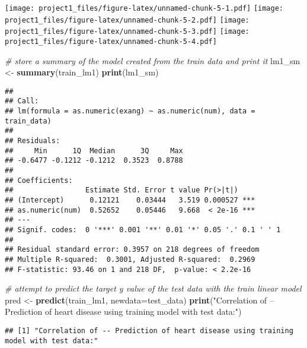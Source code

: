 \documentclass[]{article}
\newenvironment{Shaded}{\begin{snugshade}}{\end{snugshade}}
\newcommand{\KeywordTok}[1]{\textcolor[rgb]{0.13,0.29,0.53}{\textbf{#1}}}
\newcommand{\DataTypeTok}[1]{\textcolor[rgb]{0.13,0.29,0.53}{#1}}
\newcommand{\StringTok}[1]{\textcolor[rgb]{0.31,0.60,0.02}{#1}}
\newcommand{\CommentTok}[1]{\textcolor[rgb]{0.56,0.35,0.01}{\textit{#1}}}
\newcommand{\OperatorTok}[1]{\textcolor[rgb]{0.81,0.36,0.00}{\textbf{#1}}}
\newcommand{\NormalTok}[1]{#1}
\begin{document}
\texttt{[image: project1\_files/figure-latex/unnamed-chunk-5-1.pdf]}
\texttt{[image: project1\_files/figure-latex/unnamed-chunk-5-2.pdf]}
\texttt{[image: project1\_files/figure-latex/unnamed-chunk-5-3.pdf]}
\texttt{[image: project1\_files/figure-latex/unnamed-chunk-5-4.pdf]}

\begin{Shaded}
\begin{Highlighting}[]
\CommentTok{# store a summary of the model created from the train data and print it}
\NormalTok{lm1_sm <-}\StringTok{ }\KeywordTok{summary}\NormalTok{(train_lm1)}
\KeywordTok{print}\NormalTok{(lm1_sm)}
\end{Highlighting}
\end{Shaded}

\begin{verbatim}
## 
## Call:
## lm(formula = as.numeric(exang) ~ as.numeric(num), data = train_data)
## 
## Residuals:
##     Min      1Q  Median      3Q     Max 
## -0.6477 -0.1212 -0.1212  0.3523  0.8788 
## 
## Coefficients:
##                 Estimate Std. Error t value Pr(>|t|)    
## (Intercept)      0.12121    0.03444   3.519 0.000527 ***
## as.numeric(num)  0.52652    0.05446   9.668  < 2e-16 ***
## ---
## Signif. codes:  0 '***' 0.001 '**' 0.01 '*' 0.05 '.' 0.1 ' ' 1
## 
## Residual standard error: 0.3957 on 218 degrees of freedom
## Multiple R-squared:  0.3001, Adjusted R-squared:  0.2969 
## F-statistic: 93.46 on 1 and 218 DF,  p-value: < 2.2e-16
\end{verbatim}

\begin{Shaded}
\begin{Highlighting}[]
\CommentTok{# attempt to predict the target y value of the test data with the train linear model}
\NormalTok{pred <-}\StringTok{ }\KeywordTok{predict}\NormalTok{(train_lm1, }\DataTypeTok{newdata=}\NormalTok{test_data)}
\KeywordTok{print}\NormalTok{(}\StringTok{"Correlation of -- Prediction of heart disease using training model with test data:"}\NormalTok{)}
\end{Highlighting}
\end{Shaded}

\begin{verbatim}
## [1] "Correlation of -- Prediction of heart disease using training model with test data:"
\end{verbatim}

\begin{Shaded}
\end{Shaded}
\end{document}
